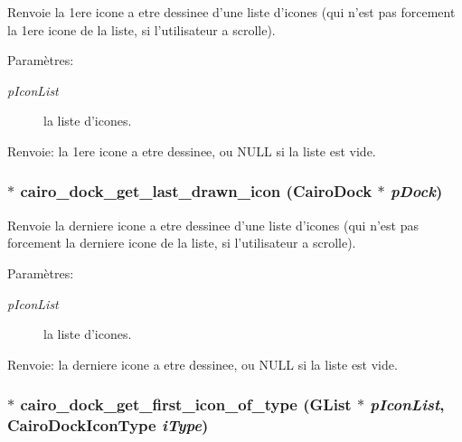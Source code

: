 Renvoie la 1ere icone a etre dessinee d'une liste d'icones (qui n'est pas forcement la 1ere icone de la liste, si l'utilisateur a scrolle). \begin{Desc}
\item[Param\`{e}tres:]
\begin{description}
\item[{\em p\-Icon\-List}]la liste d'icones. \end{description}
\end{Desc}
\begin{Desc}
\item[Renvoie:]la 1ere icone a etre dessinee, ou NULL si la liste est vide. \end{Desc}
\subsubsection{$\ast$ cairo\_\-dock\_\-get\_\-last\_\-drawn\_\-icon ({\bf Cairo\-Dock} $\ast$ {\em p\-Dock})}\label{cairo-dock-icons_8c_1b554df6ac772507962a71409d457ea5}


Renvoie la derniere icone a etre dessinee d'une liste d'icones (qui n'est pas forcement la derniere icone de la liste, si l'utilisateur a scrolle). \begin{Desc}
\item[Param\`{e}tres:]
\begin{description}
\item[{\em p\-Icon\-List}]la liste d'icones. \end{description}
\end{Desc}
\begin{Desc}
\item[Renvoie:]la derniere icone a etre dessinee, ou NULL si la liste est vide. \end{Desc}
\subsubsection{$\ast$ cairo\_\-dock\_\-get\_\-first\_\-icon\_\-of\_\-type (GList $\ast$ {\em p\-Icon\-List}, {\bf Cairo\-Dock\-Icon\-Type} {\em i\-Type})}\label{cairo-dock-icons_8c_9a7036812e508856128697b1c8b39c32}



